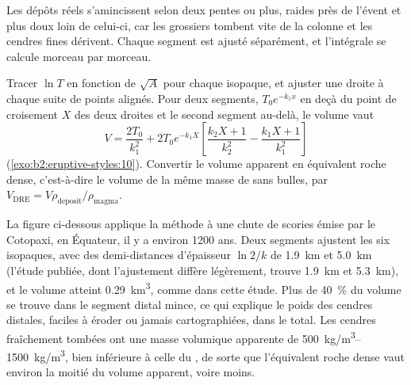 Les dépôts réels s'amincissent selon deux pentes ou plus, raides près de l'évent et
plus doux loin de celui-ci, car les  grossiers tombent vite de la colonne et les cendres
fines dérivent. Chaque segment est ajusté séparément, et l'intégrale se calcule
morceau par morceau.

\begin{method}\label{met:b2:eruptive-styles:volume}
Tracer $\ln T$ en fonction de $\sqrt A$ pour chaque isopaque, et ajuster une droite à chaque
suite de points alignés. Pour deux segments, $T_0e^{-k_1x}$ en deçà du point de croisement
$X$ des deux droites et le second segment au-delà, le volume vaut
\[
V = \frac{2T_0}{k_1^2} + 2T_0e^{-k_1X}\left[\frac{k_2X + 1}{k_2^2} -
\frac{k_1X + 1}{k_1^2}\right]
\]
(\cref{exo:b2:eruptive-styles:10}). Convertir le volume apparent en équivalent roche dense, c'est-à-dire le volume de la
même masse de  sans bulles, par $V_{\mathrm{DRE}} = V\rho_{\mathrm{deposit}}/\rho_{\mathrm{magma}}$.
\end{method}

La figure ci-dessous applique la méthode à une chute de scories émise par le Cotopaxi, en
Équateur, il y a environ \num{1200} ans. Deux segments ajustent les six isopaques, avec des
demi-distances d'épaisseur $\ln 2/k$ de \qty{1.9}{km} et \qty{5.0}{km} (l'étude publiée,
dont l'ajustement diffère légèrement, trouve \qty{1.9}{km} et
\qty{5.3}{km}), et le volume atteint \qty{0.29}{km^3}, comme dans cette étude. Plus de
\qty{40}{\percent} du volume se trouve dans le segment distal mince, ce qui explique le poids des cendres distales,
faciles à éroder ou jamais cartographiées, dans le total. Les cendres fraîchement tombées
ont une masse volumique apparente de \qtyrange{500}{1500}{kg/m^3}, bien inférieure à celle du
, de sorte que l'équivalent roche dense vaut environ la moitié du volume apparent, voire moins.

